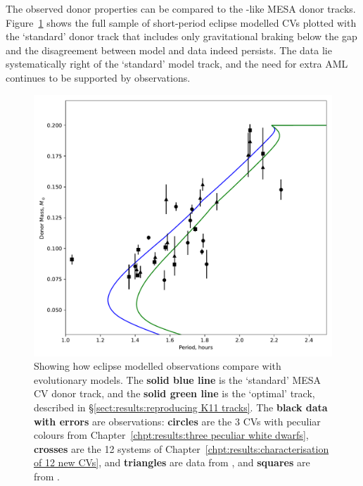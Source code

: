 The observed donor properties can be compared to the \citet{knigge11}-like MESA donor tracks. Figure~\ref{fig:discussion:donor model with eclipsers plotted} shows the full sample of short-period eclipse modelled CVs plotted with the `standard' donor track that includes only gravitational braking below the gap and the disagreement between model and data indeed persists. The data lie systematically right of the `standard' model track, and the need for extra AML continues to be supported by observations.
\begin{figure}
    \centering
    \includegraphics[width=\textwidth]{figures/results/Mdot/K11_donor_track_with_eclipse_modelled_data.pdf}
    \caption{Showing how eclipse modelled observations compare with evolutionary models. The {\bf solid blue line} is the `standard' MESA CV donor track, and the {\bf solid green line} is the `optimal' track, described in \S\ref{sect:results:reproducing K11 tracks}. The {\bf black data with errors} are observations: {\bf circles} are the 3 CVs with peculiar colours from Chapter~\ref{chpt:results:three peculiar white dwarfs}, {\bf crosses} are the 12 systems of Chapter~\ref{chpt:results:characterisation of 12 new CVs}, and {\bf triangles} are data from \citet{McAllister2019}, and {\bf squares} are from \citet{Savoury2011}.}
    \label{fig:discussion:donor model with eclipsers plotted}
\end{figure}




